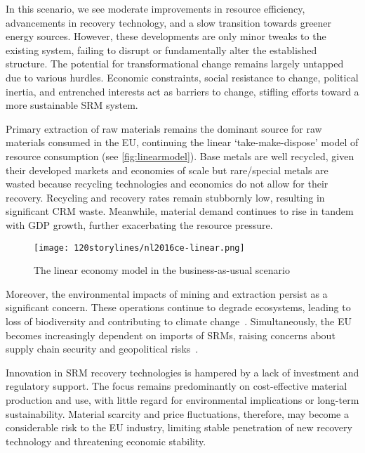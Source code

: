 In this scenario, we see moderate improvements in resource efficiency, advancements in recovery technology, and a slow transition towards greener energy sources. However, these developments are only minor tweaks to the existing system, failing to disrupt or fundamentally alter the established structure. The potential for transformational change remains largely untapped due to various hurdles. Economic constraints, social resistance to change, political inertia, and entrenched interests act as barriers to change, stifling efforts toward a more sustainable SRM system.

Primary extraction of raw materials remains the dominant source for raw materials consumed in the EU, continuing the linear `take-make-dispose' model of resource consumption (see \autoref{fig:linearmodel}). Base metals are well recycled, given their developed markets and economies of scale but rare/special metals are wasted because recycling technologies and economics do not allow for their recovery. Recycling and recovery rates remain stubbornly low, resulting in significant CRM waste. Meanwhile, material demand continues to rise in tandem with GDP growth, further exacerbating the resource pressure.


\begin{figure}[h!]
  \centering
  \texttt{[image: 120storylines/nl2016ce-linear.png]}
  \caption[The linear economy model in the business-as-usual scenario]{The linear economy model in the business-as-usual scenario~\cite{nl2016ceplan}}
  \label{fig:linearmodel}
\end{figure}


Moreover, the environmental impacts of mining and extraction persist as a significant concern. These operations continue to degrade ecosystems, leading to loss of biodiversity and contributing to climate change~\cite{ipcc2024climate}. Simultaneously, the EU becomes increasingly dependent on imports of SRMs, raising concerns about supply chain security and geopolitical risks~\cite{ipcc2024climate}.

Innovation in SRM recovery technologies is hampered by a lack of investment and regulatory support. The focus remains predominantly on cost-effective material production and use, with little regard for environmental implications or long-term sustainability. Material scarcity and price fluctuations, therefore, may become a considerable risk to the EU industry, limiting stable penetration of new recovery technology and threatening economic stability.

